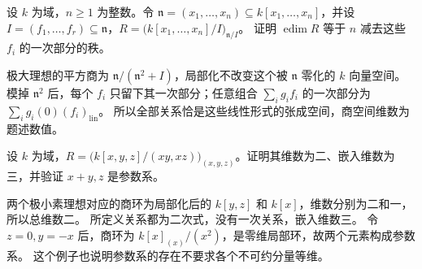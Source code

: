 \begin{exercise}\label{b3:ex:09-tangent-linear-relations}
	设 \(k\) 为域，\(n\ge1\) 为整数。令 \(\mathfrak n=(x_1,\ldots,x_n)\subseteq k[x_1,\ldots,x_n]\)，并设 \(I=(f_1,\ldots,f_r)\subseteq\mathfrak n\)，\(R=\bigl(k[x_1,\ldots,x_n]/I\bigr)_{\mathfrak n/I}\)。 证明 \(\operatorname{edim}R\) 等于 \(n\) 减去这些 \(f_i\) 的一次部分的秩。
\end{exercise}
\begin{solution}
	极大理想的平方商为 \(\mathfrak n/(\mathfrak n^2+I)\)，局部化不改变这个被 \(\mathfrak n\) 零化的 \(k\) 向量空间。 模掉 \(\mathfrak n^2\) 后，每个 \(f_i\) 只留下其一次部分；任意组合 \(\sum_i g_if_i\) 的一次部分为 \(\sum_i g_i(0)(f_i)_{\mathrm{lin}}\)。 所以全部关系恰是这些线性形式的张成空间，商空间维数为题述数值。
\end{solution}

\begin{exercise}\label{b3:ex:09-nonpure-parameter}
	设 \(k\) 为域，\(R=\bigl(k[x,y,z]/(xy,xz)\bigr)_{(x,y,z)}\)。证明其维数为二、嵌入维数为三，并验证 \(x+y,z\) 是参数系。
\end{exercise}
\begin{solution}
	两个极小素理想对应的商环为局部化后的 \(k[y,z]\) 和 \(k[x]\)，维数分别为二和一，所以总维数二。 所定义关系都为二次式，没有一次关系，嵌入维数三。 令 \(z=0,y=-x\) 后，商环为 \(k[x]_{(x)}/(x^2)\)，是零维局部环，故两个元素构成参数系。 这个例子也说明参数系的存在不要求各个不可约分量等维。
\end{solution}

